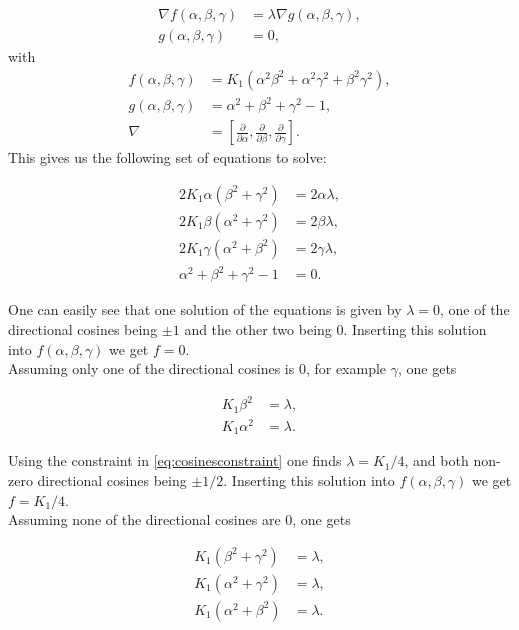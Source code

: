 \documentclass[1p]{elsarticle}		%
\numberwithin{equation}{section}
\begin{document}
\begin{align}
\nabla f(\alpha, \beta, \gamma) &= \lambda \nabla g(\alpha, \beta, \gamma), \\
g(\alpha, \beta, \gamma) &= 0,
\end{align}
with
\begin{align}
f(\alpha, \beta, \gamma) &= K_1 (\alpha^2\beta^2+\alpha^2\gamma^2+\beta^2\gamma^2), \\
g(\alpha, \beta, \gamma) &= \alpha^2+\beta^2+\gamma^2 - 1,\\
\nabla &= \left[\frac{\partial}{\partial\alpha}, \frac{\partial}{\partial\beta}, \frac{\partial}{\partial\gamma}\right].
\end{align}
This gives us the following set of equations to solve:

\begin{align*}
2K_1\alpha (\beta^2+\gamma^2) &= 2\alpha\lambda, \\ 
2K_1\beta (\alpha^2+\gamma^2) &= 2\beta\lambda, \\ 
2K_1\gamma (\alpha^2+\beta^2) &= 2\gamma\lambda, \\ 
\alpha^2+\beta^2+\gamma^2 - 1 &= 0.
\end{align*}

One can easily see that one solution of the equations is given by $\lambda = 0$, one of the directional cosines being $\pm 1$ and the other two being 0. Inserting this solution into $f(\alpha, \beta, \gamma)$ we get $f = 0$. \\

Assuming only one of the directional cosines is 0, for example $\gamma$, one gets

\begin{align*}
K_1 \beta^2 &= \lambda, \\ 
K_1 \alpha^2 &= \lambda.
\end{align*}

Using the constraint in \eqref{eq:cosinesconstraint} one finds $\lambda = K_1/4$, and both non-zero directional cosines being $\pm 1/2$. Inserting this solution into $f(\alpha, \beta, \gamma)$ we get $f = K_1/4$. \\

Assuming none of the directional cosines are 0, one gets

\begin{align*}
K_1 (\beta^2+\gamma^2) &= \lambda, \\ 
K_1 (\alpha^2+\gamma^2) &= \lambda, \\ 
K_1 (\alpha^2+\beta^2) &= \lambda.
\end{align*}
\end{document}
